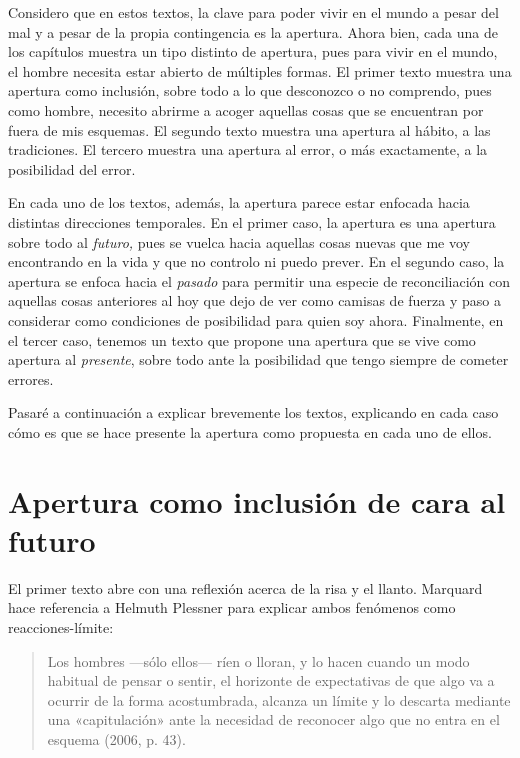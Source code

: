 \begin{refsection}
Considero que en estos textos, la clave para poder vivir en el mundo a pesar del mal y a pesar de la propia contingencia es la apertura. Ahora bien, cada una de los capítulos muestra un tipo distinto de apertura, pues para vivir en el mundo, el hombre necesita estar abierto de múltiples formas. El primer texto muestra una apertura como inclusión, sobre todo a lo que desconozco o no comprendo, pues como hombre, necesito abrirme a acoger aquellas cosas que se encuentran por fuera de mis esquemas. El segundo texto muestra una apertura al hábito, a las tradiciones. El tercero muestra una apertura al error, o más exactamente, a la posibilidad del error.

En cada uno de los textos, además, la apertura parece estar enfocada hacia distintas direcciones temporales. En el primer caso, la apertura es una apertura sobre todo al \emph{futuro,} pues se vuelca hacia aquellas cosas nuevas que me voy encontrando en la vida y que no controlo ni puedo prever. En el segundo caso, la apertura se enfoca hacia el \emph{pasado} para permitir una especie de reconciliación con aquellas cosas anteriores al hoy que dejo de ver como camisas de fuerza y paso a considerar como condiciones de posibilidad para quien soy ahora. Finalmente, en el tercer caso, tenemos un texto que propone una apertura que se vive como apertura al \emph{presente}, sobre todo ante la posibilidad que tengo siempre de cometer errores.

Pasaré a continuación a explicar brevemente los textos, explicando en cada caso cómo es que se hace presente la apertura como propuesta en cada uno de ellos.

\section{Apertura como inclusión de cara al futuro}

El primer texto abre con una reflexión acerca de la risa y el llanto. Marquard hace referencia a Helmuth Plessner para explicar ambos fenómenos como reacciones-límite:

\begin{quote}
Los hombres ---sólo ellos--- ríen o lloran, y lo hacen cuando un modo habitual de pensar o sentir, el horizonte de expectativas de que algo va a ocurrir de la forma acostumbrada, alcanza un límite y lo descarta mediante una «capitulación» ante la necesidad de reconocer algo que no entra en el esquema (2006, p. 43).
\end{quote}


\end{refsection}
